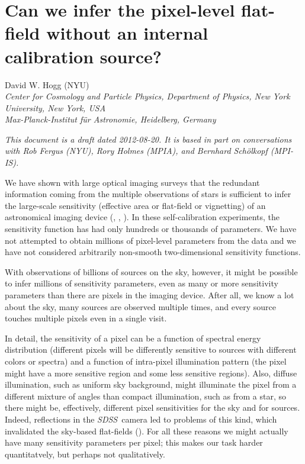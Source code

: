 \documentclass[12pt,preprint,dvips]{aastex}
\newcommand{\project}[1]{\textsl{#1}}
\newcommand{\SDSS}{\project{SDSS}}
\begin{document}
\section*{Can we infer the pixel-level flat-field without an internal calibration source?}

\noindent
David W. Hogg (NYU)
\\{\footnotesize
\textsl{Center for Cosmology and Particle Physics, Department of Physics, New York University, New York, USA}
\\
\textsl{Max-Planck-Institut f\"ur Astronomie, Heidelberg, Germany}}

\textsl{This document is a draft dated 2012-08-20.  It is based in
  part on conversations with Rob Fergus (NYU), Rory Holmes (MPIA), and
  Bernhard Sch\"olkopf (MPI-IS).}

We have shown with large optical imaging surveys that the redundant
information coming from the multiple observations of stars is
sufficient to infer the large-scale sensitivity (effective area or
flat-field or vignetting) of an astronomical imaging device
(\citealt{ubercal}, \citealt{schlafly}, \citealt{holmes}).  In these
self-calibration experiments, the sensitivity function has had only
hundreds or thousands of parameters.  We have not attempted to obtain
millions of pixel-level parameters from the data and we have not
considered arbitrarily non-smooth two-dimensional sensitivity
functions.

With observations of billions of sources on the sky, however, it might
be possible to infer millions of sensitivity parameters, even as many
or more sensitivity parameters than there are pixels in the imaging
device.  After all, we know a lot about the sky, many sources are
observed multiple times, and every source touches multiple pixels even
in a single visit.

In detail, the sensitivity of a pixel can be a function of spectral
energy distribution (different pixels will be differently sensitive to
sources with different colors or spectra) and a function of
intra-pixel illumination pattern (the pixel might have a more
sensitive region and some less sensitive regions).  Also, diffuse
illumination, such as uniform sky background, might illuminate the
pixel from a different mixture of angles than compact illumination,
such as from a star, so there might be, effectively, different pixel
sensitivities for the sky and for sources.  Indeed, reflections in the
\SDSS\ camera led to problems of this kind, which invalidated the
sky-based flat-fields (\citealt{ubercal}).  For all these reasons we
might actually have many sensitivity parameters per pixel; this makes
our task harder quantitatvely, but perhaps not qualitatively.
\end{document}

